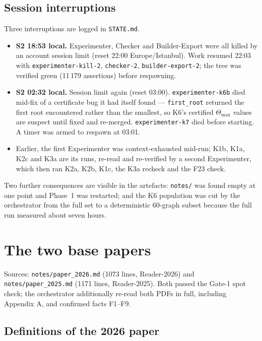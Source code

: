 \documentclass[10pt,a4paper]{article}
\newcommand{\fn}[1]{\nolinkurl{#1}}
\begin{document}
\subsection{Session interruptions}

Three interruptions are logged in \fn{STATE.md}.

\begin{itemize}[nosep,leftmargin=5mm]
\item \textbf{S2 18:53 local.} Experimenter, Checker and Builder-Export were all killed by an
      account session limit (reset 22:00 Europe/Istanbul). Work resumed 22:03 with
      \texttt{experimenter-kill-2}, \texttt{checker-2}, \texttt{builder-export-2}; the tree was
      verified green (11\,179 assertions) before respawning.
\item \textbf{S2 02:32 local.} Session limit again (reset 03:00). \texttt{experimenter-k6b} died
      mid-fix of a certificate bug it had itself found --- \fn{first_root} returned the first
      root encountered rather than the smallest, so K6's certified $\Theta_{\max}$ values are
      suspect until fixed and re-merged. \texttt{experimenter-k7} died before starting. A timer
      was armed to respawn at 03:01.
\item Earlier, the first Experimenter was context-exhausted mid-run; K1b, K1a, K2c and K3a are
      its runs, re-read and re-verified by a second Experimenter, which then ran K2a, K2b, K1c,
      the K3a recheck and the F23 check.
\end{itemize}

Two further consequences are visible in the artefacts: \fn{notes/} was found empty at one point
and Phase~1 was restarted; and the K6 population was cut by the orchestrator from the full set
to a deterministic 60-graph subset because the full run measured about seven hours.

\section{The two base papers}

Sources: \fn{notes/paper_2026.md} (1073 lines, Reader-2026) and \fn{notes/paper_2025.md}
(1171 lines, Reader-2025). Both passed the Gate-1 spot check; the orchestrator additionally
re-read both PDFs in full, including Appendix A, and confirmed facts F1--F9.

\subsection{Definitions of the 2026 paper}
\end{document}
